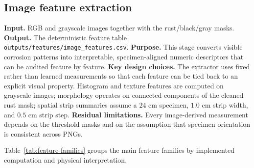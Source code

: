 \documentclass[10pt,a4paper,twocolumn]{article}
\begin{document}
\subsection{Image feature extraction}

\textbf{Input.} RGB and grayscale images together with the rust/black/gray masks. \textbf{Output.} The deterministic feature table \texttt{outputs/features/image\_features.csv}. \textbf{Purpose.} This stage converts visible corrosion patterns into interpretable, specimen-aligned numeric descriptors that can be audited feature by feature. \textbf{Key design choices.} The extractor uses fixed rather than learned measurements so that each feature can be tied back to an explicit visual property. Histogram and texture features are computed on grayscale images; morphology operates on connected components of the cleaned rust mask; spatial strip summaries assume a $24$ cm specimen, $1.0$ cm strip width, and $0.5$ cm strip step. \textbf{Residual limitations.} Every image-derived measurement depends on the threshold masks and on the assumption that specimen orientation is consistent across PNGs.

Table~\ref{tab:feature-families} groups the main feature families by implemented computation and physical interpretation.
\end{document}
